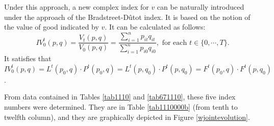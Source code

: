 Under this approach, a new complex index for $v$ can be naturally introduced under the approach of the {Bradstreet-D\^utot index}. It is based on the notion of the value of good indicated by $v$. It can be calculated as follows:
\begin{equation}\label{nivalue}IV_{0}^t(p,q)=\frac{V_t(p,q)}{V_0(p,q)}=\frac{\sum_{i=1}^n p_{it}q_{it}   }{\sum_{i=1}^n p_{i0}q_{i0} },\mbox{ for each }t\in\{0,\cdots,T\}.\end{equation}
It satisfies that $IV_{0}^t(p,q)=L^t(p_0,q)\cdot P^t(p_0,q)=L^t(p,q_0)\cdot P^t(p,q_0)=F^t(p_0,q)\cdot F^t(p,q_0)$.

%
%   
%
From data contained in Tables \ref{tab1110} and \ref{tab671110}, these five index numbers were determined. They are in Table \ref{tab1110000b} (from 
tenth to twelfth column), and they are graphically depicted in Figure \ref{wjointevolution}.

  \small{
	\begin{table}[h!]\centering{}\caption{Weighted complex price indexes for the unitary value of combustibles and energy resources
	 for the main home in Spain from
			2006 to 2015.}\label{tab1110000b}\end{table}\vspace{-0.2 cm}
}


